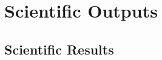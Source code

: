 \section{Scientific Outputs}
\label{sec:Outputs}

\subsection{Scientific Results}
\label{sec:Results}

